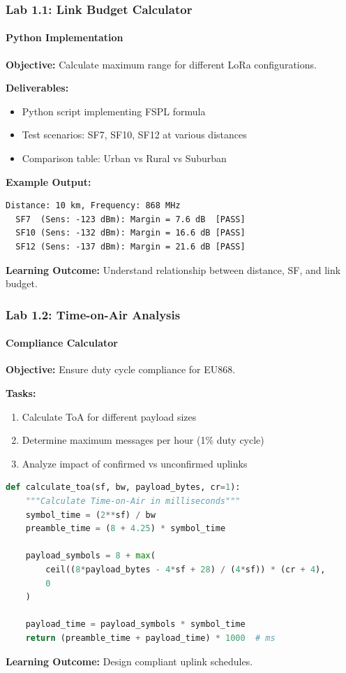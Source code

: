\documentclass{beamer}
\begin{document}
\begin{frame}[fragile]
\frametitle{Lab 1.1: Link Budget Calculator}
\framesubtitle{Python Implementation}

\textbf{Objective:} Calculate maximum range for different LoRa configurations.

\textbf{Deliverables:}
\begin{itemize}
    \item Python script implementing FSPL formula
    \item Test scenarios: SF7, SF10, SF12 at various distances
    \item Comparison table: Urban vs Rural vs Suburban
\end{itemize}

\vspace{1em}

\textbf{Example Output:}
\begin{verbatim}
Distance: 10 km, Frequency: 868 MHz
  SF7  (Sens: -123 dBm): Margin = 7.6 dB  [PASS]
  SF10 (Sens: -132 dBm): Margin = 16.6 dB [PASS]
  SF12 (Sens: -137 dBm): Margin = 21.6 dB [PASS]
\end{verbatim}

\vspace{1em}

\textbf{Learning Outcome:} Understand relationship between distance, SF, and link budget.
\end{frame}

\begin{frame}[fragile]
\frametitle{Lab 1.2: Time-on-Air Analysis}
\framesubtitle{Compliance Calculator}

\textbf{Objective:} Ensure duty cycle compliance for EU868.

\textbf{Tasks:}
\begin{enumerate}
    \item Calculate ToA for different payload sizes
    \item Determine maximum messages per hour (1\% duty cycle)
    \item Analyze impact of confirmed vs unconfirmed uplinks
\end{enumerate}

\vspace{1em}

\begin{lstlisting}[language=Python, basicstyle=\tiny\ttfamily]
def calculate_toa(sf, bw, payload_bytes, cr=1):
    """Calculate Time-on-Air in milliseconds"""
    symbol_time = (2**sf) / bw
    preamble_time = (8 + 4.25) * symbol_time

    payload_symbols = 8 + max(
        ceil((8*payload_bytes - 4*sf + 28) / (4*sf)) * (cr + 4),
        0
    )

    payload_time = payload_symbols * symbol_time
    return (preamble_time + payload_time) * 1000  # ms
\end{lstlisting}

\textbf{Learning Outcome:} Design compliant uplink schedules.
\end{frame}
\end{document}
